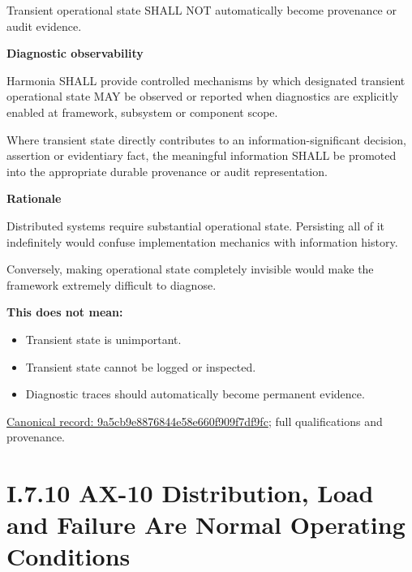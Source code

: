 Transient operational state SHALL NOT automatically become provenance or
audit evidence.



\par\medskip\textbf{Diagnostic observability}\par


Harmonia SHALL provide controlled mechanisms by which designated
transient operational state MAY be observed or reported when diagnostics
are explicitly enabled at framework, subsystem or component scope.



Where transient state directly contributes to an information-significant
decision, assertion or evidentiary fact, the meaningful information
SHALL be promoted into the appropriate durable provenance or audit
representation.



\par\medskip\textbf{Rationale}\par


Distributed systems require substantial operational state. Persisting
all of it indefinitely would confuse implementation mechanics with
information history.



Conversely, making operational state completely invisible would make the
framework extremely difficult to diagnose.



\textbf{This does not mean:}



\begin{itemize}


\item Transient state is unimportant.

\item Transient state cannot be logged or inspected.

\item Diagnostic traces should automatically become permanent evidence.

\end{itemize}

{\footnotesize \href{../../../../../../../continuum/motivation/principle/9a5cb9e8876844e58e660f909f7df9fc.md}{Canonical record: 9a5cb9e8876844e58e660f909f7df9fc}; full qualifications and provenance.}\par
\section*{I.7.10 AX-10 Distribution, Load and Failure Are Normal Operating Conditions}
\label{navigation:I.7.10}

